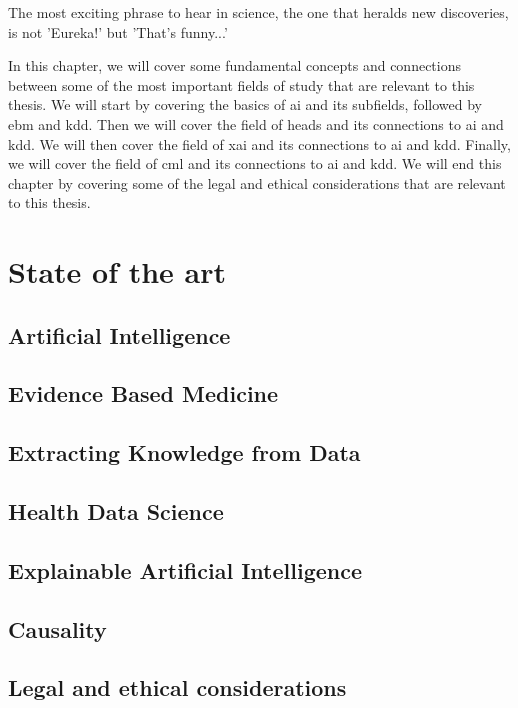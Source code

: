 \begin{savequote}[75mm]
The most exciting phrase to hear in science, the one that heralds new discoveries, is not 'Eureka!' but 'That's funny...'
\end{savequote}

In this chapter, we will cover some fundamental concepts and connections between some of the most important fields of study that are relevant to this thesis. We will start by covering the basics of \ac{ai} and its subfields, followed by \ac{ebm} and \ac{kdd}. Then we will cover the field of \ac{heads} and its connections to \ac{ai} and \ac{kdd}. We will then cover the field of \ac{xai} and its connections to \ac{ai} and \ac{kdd}. Finally, we will cover the field of \ac{cml} and its connections to \ac{ai} and \ac{kdd}. We will end this chapter by covering some of the legal and ethical considerations that are relevant to this thesis.

\chapter{State of the art} \label{chap:sota}


\section{Artificial Intelligence}


\section{Evidence Based Medicine}\label{subsec:ebm}




\section{Extracting Knowledge from Data}\label{sec:kdd}



\section{Health Data Science}



\section{Explainable Artificial Intelligence}\label{subsec:xai}




\section{Causality}\label{causalml}




\section{Legal and ethical considerations}


